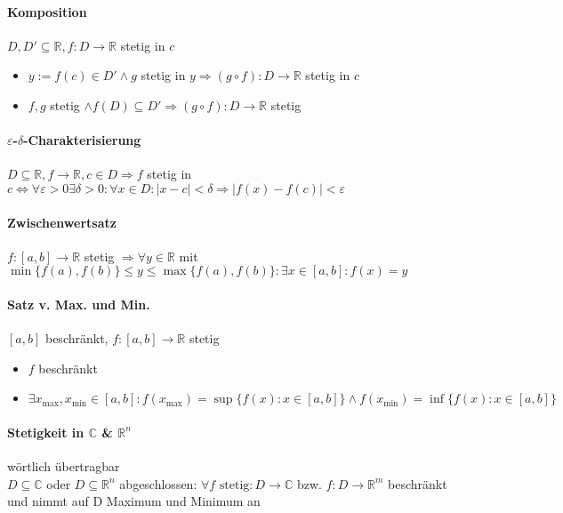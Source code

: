 \documentclass[paper=a3,paper=landscape, fontsize=9pt,DIV=30]{scrartcl}
\newcommand{\real}{{\mathbb{R}}}
\newcommand{\compl}{\mathbb{C}}
\begin{document}
\begin{multicols*}{4}
  \paragraph{Komposition}
  $D,D' \subseteq \real, f:D \rightarrow \real$ stetig in $c$
  \begin{itemize}
  \item $y := f(c) \in D' \wedge g $ stetig in $y \Rightarrow (g \circ f): D \rightarrow \real$ stetig in $c$
  \item $f,g$ stetig $\wedge f(D) \subseteq D' \Rightarrow (g \circ f): D \rightarrow \real$ stetig
  \end{itemize}


  \paragraph{$\varepsilon$-$\delta$-Charakterisierung}
  $D \subseteq \real, f \rightarrow \real, c \in D \Rightarrow f$ stetig in $c \Leftrightarrow \forall \varepsilon > 0 \exists \delta > 0: \forall x \in D: \lvert x - c \rvert < \delta \Rightarrow \lvert f(x)-f(c)\rvert < \varepsilon$


  \paragraph{Zwischenwertsatz}
  $f:[a,b] \rightarrow \real$ stetig $\Rightarrow \forall y \in \real$ mit $ \min\{f(a),f(b)\} \leq y \leq \max\{f(a), f(b)\}: \exists x \in [a,b]: f(x)=y$


  \paragraph{Satz v. Max. und Min.}
  $[a,b]$ beschränkt, $f: [a,b] \rightarrow \real$ stetig
  \begin{itemize}
  \item $f$ beschränkt
  \item $\exists x_{\max}, x_{\min} \in [a,b]: f(x_{\max})=\sup\{f(x): x \in [a,b]\} \wedge f(x_{\min})=\inf\{f(x):x \in [a,b]\}$
  \end{itemize}

  \paragraph{Stetigkeit in $\compl$ \& $\real ^n$} wörtlich übertragbar\\
  $D \subseteq \compl$ oder $D \subseteq \real^n$ abgeschlossen: $\forall f \text{ stetig}: D \rightarrow \compl$ bzw. $f: D \rightarrow \real^m$ beschränkt und nimmt auf D Maximum und Minimum an


\end{multicols*}
\end{document}
